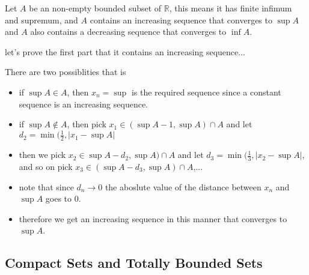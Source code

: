 \documentclass[12pt,a4paper]{article}
\begin{document}
Let \(A\)   be an non-empty bounded subset of \(\mathbb{R}\), this means it has finite infimum and supremum, and \(A\) contains an increasing sequence that converges to \(\sup A\) and \(A\) also contains a decreasing sequence that converges to \(\inf A\).     

let's prove the first part that it contains an increasing sequence...

There are two possiblities that is 
\begin{itemize}
    \item if \(\sup A \in A \), then \(x_{n}=\sup\) is the required sequence since a constant sequence is an increasing sequence.
    \item if \(\sup A \notin A\), then pick \(x_{1} \in (\sup A -1, \sup A) \cap A\) and let \(d_{2}=\min(\frac{1}{2},|x_{1}-\sup A|\)
    \item then we pick \(x_{2} \in \sup A -d_{2}, \sup A) \cap A\) and let \(d_{3}=\min(\frac{1}{3},|x_{2}-\sup A|\), and so on pick \(x_{3} \in (\sup A -d_{3}, \sup A) \cap A\),...
    \item note that since \(d_{n} \to 0\) the aboslute value of the distance between \(x_{n}\) and \(\sup A\) goes to \(0\).
    \item therefore we get an increasing sequence in this manner that converges to \(\sup A\).                        
\end{itemize}

 \subsection{Compact Sets and Totally Bounded Sets}
\end{document}

